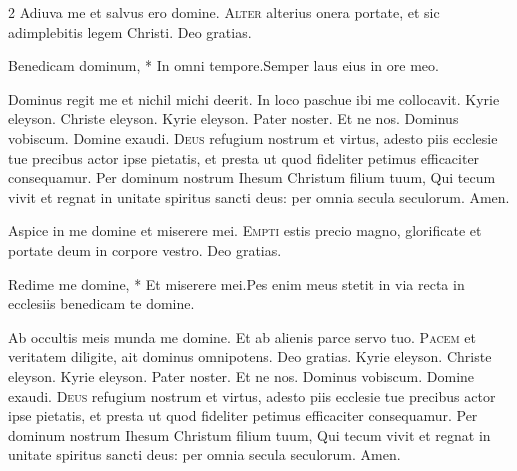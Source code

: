 \begin{multicols}{2}
\vspace{+1em}
\newline {}
\newline {}
\newline {} Adiuva me et salvus ero domine.
\newline {}
\lettrine[lines=2]{\zallmancaps \color{Blue} A}{lter} alterius onera portate, et sic adimplebitis legem Christi. \R Deo gratias.
\begin{responsory-breve}
{Benedicam dominum, * In omni tempore.}{Semper laus eius in ore meo.}
\end{responsory-breve}%
\newline \V Dominus regit me et nichil michi deerit. \R In loco paschue ibi me collocavit.
\newline {} Kyrie eleyson. Christe eleyson. Kyrie eleyson. Pater noster. Et ne nos.
\newline Dominus vobiscum.  Domine exaudi. 
\lettrine[lines=2]{\zallmancaps \color{Red} D}{eus} refugium nostrum et virtus, adesto piis ecclesie tue precibus actor ipse pietatis, et presta ut quod fideliter petimus efficaciter consequamur. Per dominum nostrum Ihesum Christum filium tuum, Qui tecum vivit et regnat in unitate spiritus sancti deus: per omnia secula seculorum. \R Amen.



\vspace{+1em}
\newline {}
\newline {}
\newline {} Aspice in me domine et miserere mei.
\newline {}
\lettrine[lines=2]{\zallmancaps \color{Blue} E}{mpti} estis precio magno, glorificate et portate deum in corpore vestro. \R Deo gratias.
\begin{responsory-breve}
{Redime me domine, * Et miserere mei.}{Pes enim meus stetit in via recta in ecclesiis benedicam te domine.}
\end{responsory-breve}%
\newline \V Ab occultis meis munda me domine. \R Et ab alienis parce servo tuo.
\lettrine[lines=2]{\zallmancaps \color{Blue} P}{acem} et veritatem diligite, ait dominus omnipotens. \R Deo gratias.
\newline {} Kyrie eleyson. Christe eleyson. Kyrie eleyson. Pater noster. Et ne nos.
\newline Dominus vobiscum.  Domine exaudi. 
\lettrine[lines=2]{\zallmancaps \color{Red} D}{eus} refugium nostrum et virtus, adesto piis ecclesie tue precibus actor ipse pietatis, et presta ut quod fideliter petimus efficaciter consequamur. Per dominum nostrum Ihesum Christum filium tuum, Qui tecum vivit et regnat in unitate spiritus sancti deus: per omnia secula seculorum. \R Amen.




\end{multicols}
